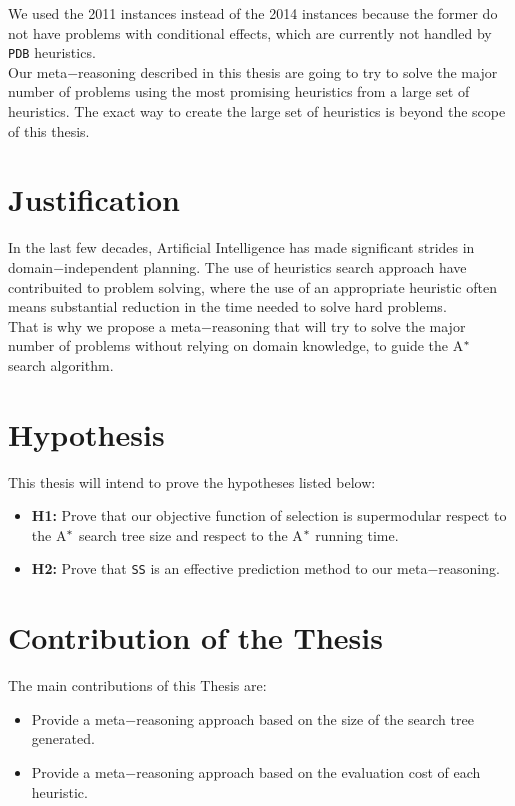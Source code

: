 We used the 2011 instances instead of the 2014 instances because the former do not have problems with conditional effects, which are currently not handled by \texttt{PDB} heuristics.\\

Our meta$-$reasoning described in this thesis are going to try to solve the major number of problems using the most promising heuristics from a large set of heuristics. The exact way to create the large set of heuristics is beyond the scope of this thesis.

\section{Justification}
\noindent
In the last few decades, Artificial Intelligence has made significant strides in domain$-$independent planning. The use of heuristics search approach have contribuited to problem solving, where the use of an appropriate heuristic often means substantial reduction in the time needed to solve hard problems.\\

That is why we propose a meta$-$reasoning that will try to solve the major number of problems without relying on domain knowledge, to guide the A$\sp{*}$ search algorithm.

\section{Hypothesis}
\noindent
This thesis will intend to prove the hypotheses listed below:
\begin{itemize}
\item \textbf{H1:} Prove that our objective function of selection is supermodular respect to the A$\sp{*}$ search tree size and respect to the A$\sp{*}$ running time.

\item \textbf{H2:} Prove that \texttt{SS} is an effective prediction method to our meta$-$reasoning.
\end{itemize}

\section{Contribution of the Thesis}
\noindent
The main contributions of this Thesis are:
\begin{itemize}
\item Provide a meta$-$reasoning approach based on the size of the search tree generated.
\item Provide a meta$-$reasoning approach based on the evaluation cost of each heuristic. 
\end{itemize}

